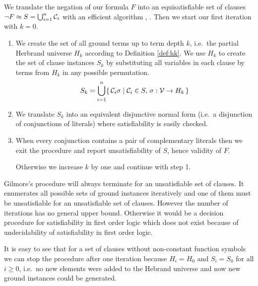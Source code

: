 \begin{procedure}\label{proc:gilmore's:prover}
	We translate the negation of our formula $F$ into an equisatisfiable set of clauses 
	$\lnot F \approx S = \bigcup_{i=1}^{n} {\mathcal C}_i$ with an efficient algorithm \cite{tseitin70}, \cite{PLAISTED1986293}.
	Then we start our first iteration with $k=0$.
	\begin{enumerate}
		
		\item We create the set of all ground terms up to term depth $k$, 
		i.e.~the partial Herbrand universe $H_k$ according to Definition \ref{def:hk}. 
		We use $H_k$ to create the set of clause instances $S_k$ 
		by substituting all variables 
		in each clause by terms from $H_k$ in any possible permutation.
		\[ S_k = \bigcup_{i=1}^{n} 
		\{\,
			{\mathcal C}_i\sigma \mid {\mathcal C}_i \in S,\,\sigma: {\mathcal V}\to H_k
		\,\}
		\]
		
		\item We translate $S_k$ into an equivalent disjunctive normal form 
		(i.e.~a disjunction of conjunctions of literals)
		where satisfiability is easily checked.
		
		

		\item When every conjunction contains a pair of complementary literals 
		then we exit the procedure and report unsatisfiability of $S$, 
		hence validity of $F$.

Otherwise we increase $k$ by one and continue with step 1.
		
		
	\end{enumerate}
	
\end{procedure}

Gilmore's procedure will always terminate for an unsatisfiable set of clauses.
It enumerates all possible sets of ground instances iteratively
and one of them must be unsatisfiable for an unsatisfiable set of clauses. 
However the number of iterations has no general upper bound. 
Otherwise it would be a decision procedure for satisfiability in first order logic
which does not exist because of undecidability of satisfiability in first order logic.

It is easy to see that for a set of clauses without non-constant function symbols
we can stop the procedure after one iteration because $H_i = H_0$ and $S_i = S_0$ for all $i\geq0$,
i.e.~no new elements were added to the Hebrand universe and now new ground instances could be generated.
%

